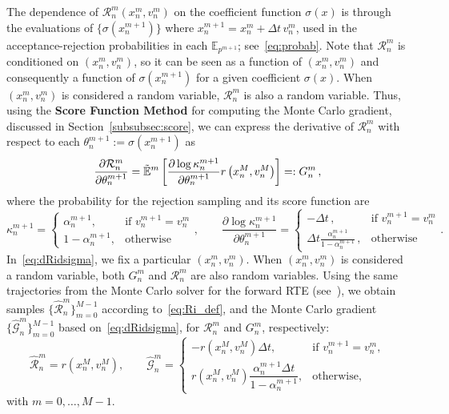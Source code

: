 \documentclass[12pt]{amsart}
\begin{document}
The dependence of $\mathcal{R}_n^m\left(x_n^m, v_n^m\right)$ on the coefficient function $\sigma(x)$ is through the evaluations of $\{\sigma(x_n^{m+1})\}$ where $x_n^{m+1} = x_n^m + \Delta t\, v_n^m$, used in the acceptance-rejection probabilities in each $\mathbb{E}_{p^{m+1}}$; see~\eqref{eq:probab}.  Note that $\mathcal{R}_n^m$ is conditioned on $(x_n^m, v_n^m)$, so it can be seen as a function of $(x_n^m, v_n^m)$ and consequently a function of  $\sigma(x_n^{m+1})$ for a given coefficient $\sigma(x)$. When $(x_n^m, v_n^m)$ is considered a random variable, $\mathcal{R}_n^m$ is also a random variable.   Thus, using the \textbf{Score Function Method} for computing the Monte Carlo gradient, discussed in Section~\ref{subsubsec:score}, we can express the derivative of $\mathcal{R}_n^m$ with respect to each $ \theta_n^{m+1} := \sigma(x_n^{m+1})$ as
\begin{equation}\label{eq:dRidsigma}
    \frac{\partial \mathcal{R}_n^m}{\partial \theta_n^{m+1}} =  \tilde{\mathbb E}^{m} \left[ \frac{\partial \log \kappa_n^{m+1} }{\partial \theta_n^{m+1} }   r\left(x_n^M,v_n^M\right)  \right] =: G_n^m\, ,
\end{equation}
where the probability for the rejection sampling and its score function are
\[
\kappa_n^{m+1}  = 
    \begin{cases}
   \alpha_n^{m+1} ,  & \text{if\ }v_n^{m+1} = v_n^m  \\
    1- \alpha_n^{m+1} , & \text{otherwise}
    \end{cases}, \qquad    
 \frac{\partial \log \kappa_n^{m+1} }{\partial \theta_n^{m+1} }   = 
    \begin{cases}
   -\Delta t \,,  & \text{if\ }v_n^{m+1} = v_n^m  \\
   \Delta t \frac{ \alpha_n^{m+1}}{1-\alpha_n^{m+1}} \,, & \text{otherwise}
    \end{cases}.
\]
In~\eqref{eq:dRidsigma}, we fix a particular $\left(x_n^m,v_n^m\right)$. When $\left(x_n^m,v_n^m\right)$ is considered a random variable, both $G_n^m$ and $\mathcal{R}_n^m$ are also random variables.   Using the same trajectories from the Monte Carlo solver for the forward RTE (see~), we obtain samples $\{ \widehat {\mathcal{R}}_n^m\}_{m=0}^{M-1}$ according to~\eqref{eq:Ri_def}, and the Monte Carlo gradient $\{  \widehat {\mathcal{G}}_n^m\}_{m=0}^{M-1}$ based on~\eqref{eq:dRidsigma}, for  $\mathcal{R}_n^m$ and $G_n^m$, respectively:
\begin{equation}\label{eq:dRidsigma_discrete}
\widehat {\mathcal{R}}_n^m =   r\left(x_n^M,v_n^M\right),\qquad   \widehat {\mathcal{G}}_n^m  = 
     \begin{cases}
     -   r\left(x_n^M,v_n^M\right) \Delta t , & \text{if\ }  v_n^{m+1} = v_n^m , \\
      r\left(x_n^M,v_n^M\right) \dfrac{ \alpha_n^{m+1}  \Delta t }{1 - \alpha_n^{m+1} }, &\text{otherwise},
     \end{cases}
\end{equation}
with $m = 0,\ldots,M-1$.
\end{document}
